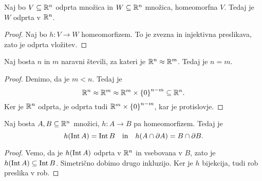 \begin{izrek}
Naj bo $V \subseteq \mathbb{R}^n$ odprta množica in $W \subseteq \mathbb{R}^n$
množica, homeomorfna $V$. Tedaj je $W$ odprta v $\mathbb{R}^n$.
\end{izrek}

\begin{proof}
Naj bo $h \colon V \to W$ homeomorfizem. To je zvezna in injektivna
preslikava, zato je odprta vložitev.
\end{proof}

\begin{posledica}
Naj bosta $n$ in $m$ naravni števili, za kateri je
$\mathbb{R}^n \approx \mathbb{R}^m$. Tedaj je $n = m$.
\end{posledica}

\begin{proof}
Denimo, da je $m < n$. Tedaj je
\[
\mathbb{R}^n \approx \mathbb{R}^m \approx \mathbb{R}^m \times \left\{0\right\}^{n-m} \subseteq \mathbb{R}^n.
\]
Ker je $\mathbb{R}^n$ odprta, je odprta tudi $\mathbb{R}^m \times \left\{0\right\}^{n-m}$,
kar je protislovje.
\end{proof}

\begin{trditev}
Naj bosta $A, B \subseteq \mathbb{R}^n$ množici, $h \colon A \to B$ pa
homeomorfizem. Tedaj je
\[
h(\operatorname{Int} A) = \operatorname{Int} B
\quad \text{in} \quad
h(A \cap \partial A) = B \cap \partial B.
\]
\end{trditev}

\begin{proof}
Vemo, da je $h(\operatorname{Int} A)$ odprta v $\mathbb{R}^n$ in vsebovana v $B$, zato je
$h(\operatorname{Int} A) \subseteq \operatorname{Int} B$. Simetrično dobimo drugo inkluzijo.
Ker je $h$ bijekcija, tudi rob preslika v rob.
\end{proof}
